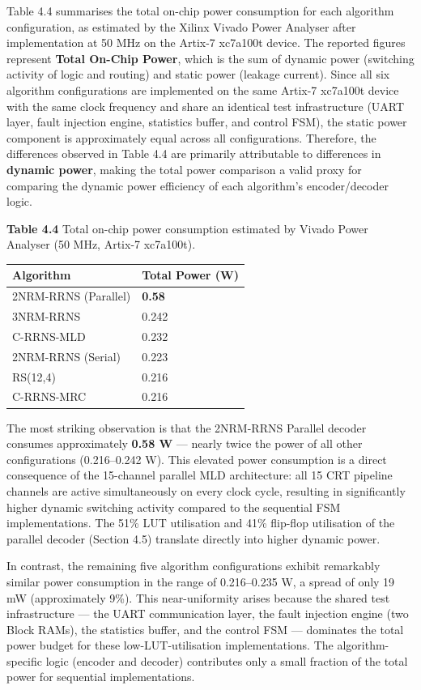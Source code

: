 Table 4.4 summarises the total on-chip power consumption for each
algorithm configuration, as estimated by the Xilinx Vivado Power
Analyser after implementation at 50 MHz on the Artix-7 xc7a100t device.
The reported figures represent \textbf{Total On-Chip Power}, which is
the sum of dynamic power (switching activity of logic and routing) and
static power (leakage current). Since all six algorithm configurations
are implemented on the same Artix-7 xc7a100t device with the same clock
frequency and share an identical test infrastructure (UART layer, fault
injection engine, statistics buffer, and control FSM), the static power
component is approximately equal across all configurations. Therefore,
the differences observed in Table 4.4 are primarily attributable to
differences in \textbf{dynamic power}, making the total power comparison
a valid proxy for comparing the dynamic power efficiency of each
algorithm's encoder/decoder logic.

\textbf{Table 4.4} Total on-chip power consumption estimated by Vivado
Power Analyser (50 MHz, Artix-7 xc7a100t).

{\def\LTcaptype{none} %
\begin{longtable}[]{@{}ll@{}}
\toprule\noalign{}
Algorithm & Total Power (W) \\
\midrule\noalign{}
\endhead
\bottomrule\noalign{}
\endlastfoot
2NRM-RRNS (Parallel) & \textbf{0.58} \\
3NRM-RRNS & 0.242 \\
C-RRNS-MLD & 0.232 \\
2NRM-RRNS (Serial) & 0.223 \\
RS(12,4) & 0.216 \\
C-RRNS-MRC & 0.216 \\
\end{longtable}
}

The most striking observation is that the 2NRM-RRNS Parallel decoder
consumes approximately \textbf{0.58 W} --- nearly twice the power of all
other configurations (0.216--0.242 W). This elevated power consumption
is a direct consequence of the 15-channel parallel MLD architecture: all
15 CRT pipeline channels are active simultaneously on every clock cycle,
resulting in significantly higher dynamic switching activity compared to
the sequential FSM implementations. The 51\% LUT utilisation and 41\%
flip-flop utilisation of the parallel decoder (Section 4.5) translate
directly into higher dynamic power.

In contrast, the remaining five algorithm configurations exhibit
remarkably similar power consumption in the range of 0.216--0.235 W, a
spread of only 19 mW (approximately 9\%). This near-uniformity arises
because the shared test infrastructure --- the UART communication layer,
the fault injection engine (two Block RAMs), the statistics buffer, and
the control FSM --- dominates the total power budget for these
low-LUT-utilisation implementations. The algorithm-specific logic
(encoder and decoder) contributes only a small fraction of the total
power for sequential implementations.

